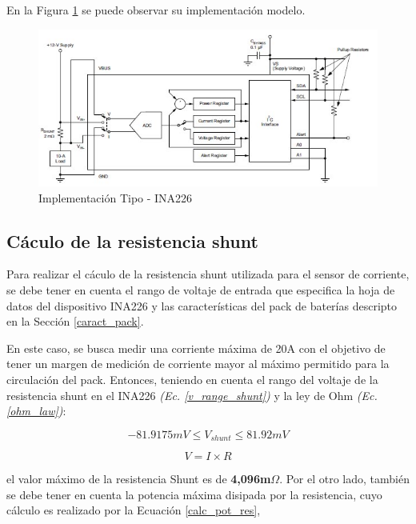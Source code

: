 \documentclass[10pt, a4paper]{report}
\begin{document}
En la Figura \ref{fig:ina226-commonimplementation} se puede observar su 
implementación modelo. 

\begin{figure}[h!]
    \begin{center}
	\includegraphics[width=0.7\linewidth]{assets/INA226-Common_Implementation}
	\caption{Implementación Tipo - INA226}
	\label{fig:ina226-commonimplementation}
    \end{center}	
\end{figure}
\FloatBarrier

\subsection{C\'aculo de la resistencia shunt}

Para realizar el c\'aculo de la resistencia shunt utilizada para el sensor de
corriente, se debe tener en cuenta el rango de voltaje de entrada que
especifica la hoja de datos del dispositivo INA226 y las caracter\'isticas del
pack de bater\'ias descripto en la Secci\'on \ref{caract_pack}. 

En este caso, se busca medir una corriente m\'axima de 20A con el objetivo de
tener un margen de medici\'on de corriente mayor al m\'aximo permitido para la
circulaci\'on del pack. Entonces, teniendo en cuenta el rango del voltaje de
la resistencia shunt en el INA226 \emph{(Ec. \ref{v_range_shunt})} y la ley de
Ohm \emph{(Ec. \ref{ohm_law})}:

\begin{equation}
    -81.9175mV \le V_{shunt} \le 81.92mV  \label{v_range_shunt}
\end{equation}

\begin{equation}
    V=I \times R \label{ohm_law}
\end{equation}

el valor m\'aximo de la resistencia Shunt es de \textbf{4,096m$\Omega$}. Por el
otro lado, tambi\'en se debe tener en cuenta la potencia m\'axima disipada por
la resistencia, cuyo c\'alculo es realizado por la Ecuaci\'on 
\ref{calc_pot_res},
\end{document}
